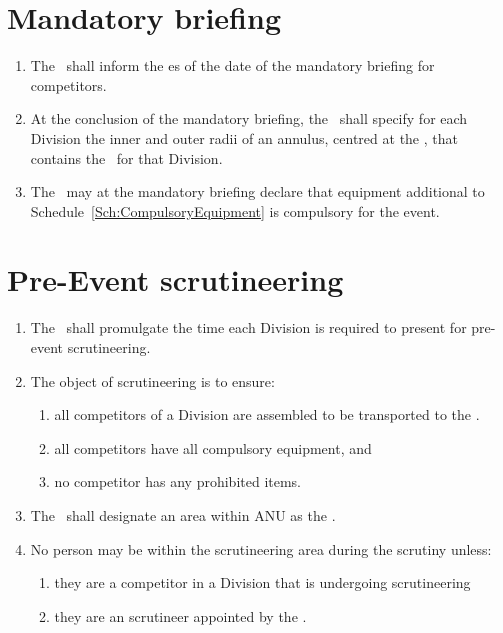 \documentclass[12pt]{report}
\begin{document}
  \section{Mandatory briefing}\label{sec:MandatoryBriefing}
  \begin{enumerate}
    \item The \RaceDirector\ shall inform the \Captain es of the date of the mandatory briefing for competitors.
    \item At the conclusion of the mandatory briefing, the \RaceDirector\ shall specify for each Division the inner and outer radii of an annulus, centred at the \Endpoint, that contains the \dropoffpoint\ for that Division.

    \item The \RaceDirector\ may at the mandatory briefing declare that equipment additional to Schedule~\ref{Sch:CompulsoryEquipment} is compulsory for the event.
  \end{enumerate}
  \section{Pre-Event scrutineering}\label{sec:PreEventScrutineering}
  \begin{enumerate}
    \item The \RaceDirector\ shall promulgate the time each Division is required to present for pre-event scrutineering.
    \item The object of scrutineering is to ensure:
    \begin{enumerate}
      \item all competitors of a Division are assembled to be transported to the \dropoffpoint.
      \item all competitors have all compulsory equipment, and
      \item no competitor has any prohibited items.
    \end{enumerate}
    \item The \RaceDirector\ shall designate an area within ANU as the .
    \item No person may be within the scrutineering area during the scrutiny unless:
    \begin{enumerate}
      \item they are a competitor in a Division that is undergoing scrutineering
      \item they are an scrutineer appointed by the \RaceDirector.
    \end{enumerate}
  \end{enumerate}
\end{document}
